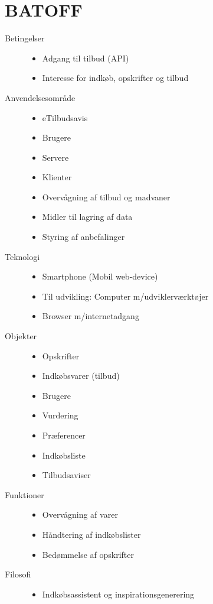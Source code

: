 \section{BATOFF}
\begin{description}
\item [Betingelser]\hfill
\begin{itemize}[nolistsep,noitemsep]
\item Adgang til tilbud (API)
\item Interesse for indkøb, opskrifter og tilbud
\end{itemize}

\item [Anvendelsesområde]\hfill
\begin{itemize}[nolistsep,noitemsep]
\item eTilbudsavis
\item Brugere
\item Servere
\item Klienter
\item Overvågning af tilbud og madvaner
\item Midler til lagring af data
\item Styring af anbefalinger
\end{itemize}

\item [Teknologi]\hfill
\begin{itemize}[nolistsep,noitemsep]
\item Smartphone (Mobil web-device)
\item Til udvikling: Computer m/udviklerværktøjer
\item Browser m/internetadgang
\end{itemize}

\item [Objekter]\hfill
\begin{itemize}[nolistsep,noitemsep]
\item Opskrifter
\item Indkøbsvarer (tilbud)
\item Brugere
\item Vurdering 
\item Præferencer
\item Indkøbsliste
\item Tilbudsaviser 
\end{itemize}

\item [Funktioner]\hfill
\begin{itemize}[nolistsep,noitemsep]
\item Overvågning af varer 
\item Håndtering af indkøbslister
\item Bedømmelse af opskrifter
\end{itemize}

\item [Filosofi]\hfill
\begin{itemize}[nolistsep,noitemsep]
\item Indkøbsassistent og inspirationsgenerering
\end{itemize}
\end{description}

 

